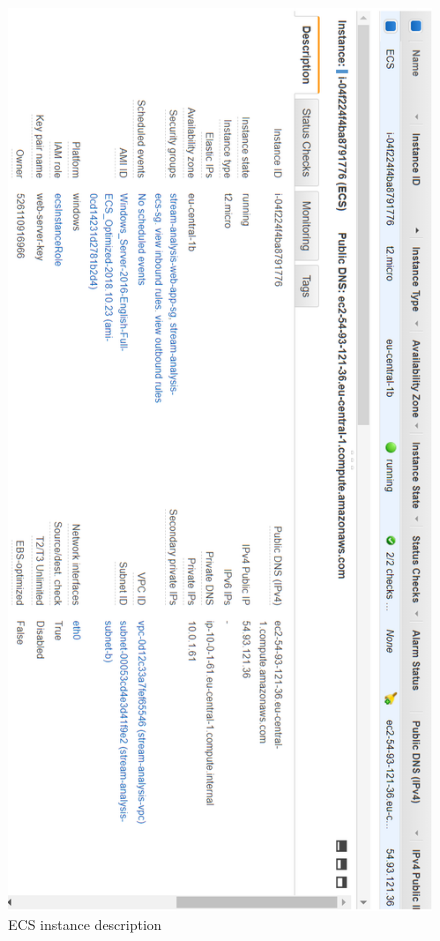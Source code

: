 \begin{figure}[p]
	\centering
	\noindent
	\includegraphics[width=0.5\paperwidth]{./images/aws_resources/ECS.PNG}
	\caption{ECS instance description}
	\label{fig:ecs}
\end{figure}


